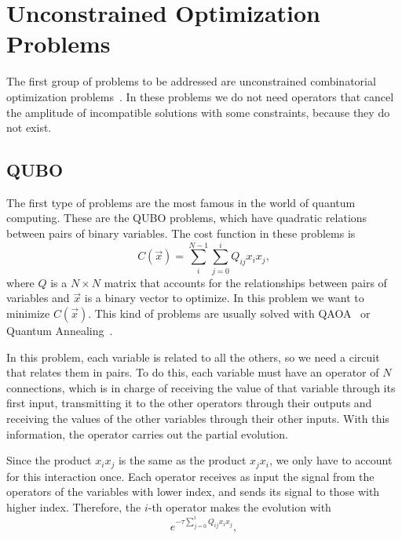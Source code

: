 \section{Unconstrained Optimization Problems}
The first group of problems to be addressed are unconstrained combinatorial optimization problems~\cite{Unconstrained}. In these problems we do not need operators that cancel the amplitude of incompatible solutions with some constraints, because they do not exist.
\subsection{QUBO}
The first type of problems are the most famous in the world of quantum computing. These are the QUBO problems, which have quadratic relations between pairs of binary variables. The cost function in these problems is
\begin{equation}\label{eq: cost QUBO}
    C(\vec{x})=\sum_{i}^{N-1}\sum_{j=0}^{i} Q_{ij}x_ix_j,
\end{equation}
where $Q$ is a $N\times N$ matrix that accounts for the relationships between pairs of variables and $\vec{x}$ is a binary vector to optimize. In this problem we want to minimize $C(\vec{x})$. This kind of problems are usually solved with QAOA~\cite{QAOA} or Quantum Annealing~\cite{Annealing}.

In this problem, each variable is related to all the others, so we need a circuit that relates them in pairs. To do this, each variable must have an operator of $N$ connections, which is in charge of receiving the value of that variable through its first input, transmitting it to the other operators through their outputs and receiving the values of the other variables through their other inputs. With this information, the operator carries out the partial evolution.

Since the product $x_i x_j$ is the same as the product $x_j x_i$, we only have to account for this interaction once. Each operator receives as input the signal from the operators of the variables with lower index, and sends its signal to those with higher index. Therefore, the $i$-th operator makes the evolution with
\begin{equation}
    e^{-\tau \sum_{j=0}^{i} Q_{ij}x_ix_j},
\end{equation}

